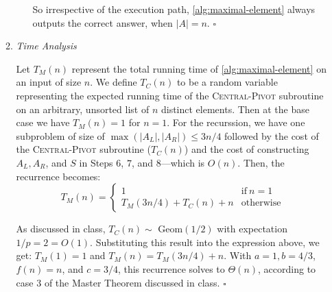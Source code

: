 \documentclass[10pt, letterpaper]{article}
\begin{document}
\begin{enumerate}[label={\bfseries Q\arabic*.}]
\begin{enumerate}
\begin{itemize}[itemsep=10pt]
            So irrespective of the execution path, \autoref{alg:maximal-element} always outputs the correct answer,
            when $|A| = n$. \hfill $\square$
        \end{itemize}

      \item
        {\itshape Time Analysis} \\ \vspace{-4mm}

        Let $T_M(n)$ represent the total running time of \autoref{alg:maximal-element} on an input of size
        $n$. We define $T_C(n)$ to be a random variable representing the expected running time of the
        \textsc{Central-Pivot} subroutine on an arbitrary, unsorted list of $n$ distinct elements. Then at
        the base case we have $T_M(n) = 1$ for $n = 1$. For the recurssion, we have one subproblem of size of
        $\max(|A_L|, |A_R|) \leq 3n/4$ followed by the cost of the \textsc{Central-Pivot} subroutine
        ($T_C(n)$) and the cost of constructing $A_L, A_R$, and $S$ in Steps $6$, $7$, and $8$---which is
        $O(n)$. Then, the recurrence becomes:
        \[
          T_M(n) = \begin{cases}1 & \text{if}\ n = 1 \\ T_M(3n/4) + T_C(n) + n & \text{otherwise}\end{cases}
        \]

        As discussed in class, $T_C(n) \sim$ Geom$(1/2)$ with expectation $1/p = 2 = O(1)$. Substituting this
        result into the expression above, we get: $T_M(1) = 1$ and $T_M(n) = T_M(3n/4) + n$. With $a = 1, b
        = 4/3$, $f(n) = n$, and $c = 3/4$, this recurrence solves to $\Theta(n)$, according to case $3$ of the
        Master Theorem discussed in class. \hfill $\square$
    \end{enumerate}
\end{enumerate}
\end{document}
